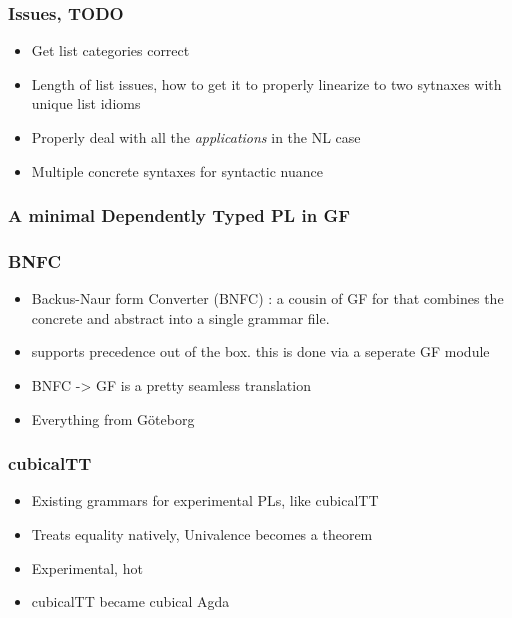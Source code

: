 \documentclass[10pt]{beamer}
\begin{document}
\begin{frame}
\frametitle{Issues, TODO}

\begin{itemize}
\item Get list categories correct
\item Length of list issues, how to get it to properly linearize to two sytnaxes
  with unique list idioms 
\item Properly deal with all the \emph{applications} in the NL case
\item Multiple concrete syntaxes for syntactic nuance
\end{itemize}
\end{frame}

\begin{frame}
\frametitle{A minimal Dependently Typed PL in GF}

\begin{itemize}
\end{itemize}

\end{frame}

\begin{frame}

\frametitle{BNFC}

\begin{itemize}
\item Backus-Naur form Converter (BNFC) : a cousin of GF for that combines the concrete and abstract
  into a single grammar file.
\item supports precedence out of the box. this is done via a seperate GF module 
\item BNFC -> GF is a pretty seamless translation
\item Everything from Göteborg 
\end{itemize}

\end{frame}

\begin{frame}
\frametitle{cubicalTT}

\begin{itemize}
\item Existing grammars for experimental PLs, like cubicalTT
\item Treats equality natively, Univalence becomes a theorem
\item Experimental, hot
\item cubicalTT became cubical Agda
\end{itemize}

\end{frame}
\end{document}
